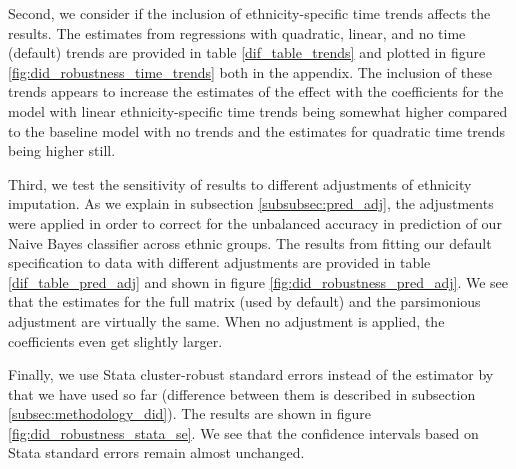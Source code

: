 Second, we consider if the inclusion of ethnicity-specific time trends affects the results.
The estimates from regressions with quadratic, linear, and no time (default) trends are  provided in table \ref{dif_table_trends} and plotted in figure \ref{fig:did_robustness_time_trends} both in the appendix. 
The inclusion of these trends appears to increase the estimates of the effect  with  the coefficients for the model with linear ethnicity-specific time trends being somewhat higher compared to the baseline model with no trends and the estimates for quadratic time trends being higher still.

Third, we test the sensitivity of results to different adjustments of ethnicity imputation. 
As we explain in subsection \ref{subsubsec:pred_adj}, the adjustments were applied in order to correct for the unbalanced accuracy in prediction of our Naive Bayes classifier across ethnic groups. The results from fitting our default specification to data with different adjustments are provided in table \ref{dif_table_pred_adj} and shown in figure \ref{fig:did_robustness_pred_adj}.
We see that the estimates for the full matrix (used by default) and the parsimonious adjustment are virtually the same. When no adjustment is applied, the coefficients even get slightly larger. 


Finally, we use Stata cluster-robust standard errors instead of the estimator by \citet{pustejovsky_small-sample_2018}  that we have used so far (difference between them is described in subsection \ref{subsec:methodology_did}). 
The results are shown in figure \ref{fig:did_robustness_stata_se}. We see that the confidence intervals based on Stata standard errors remain almost unchanged.
